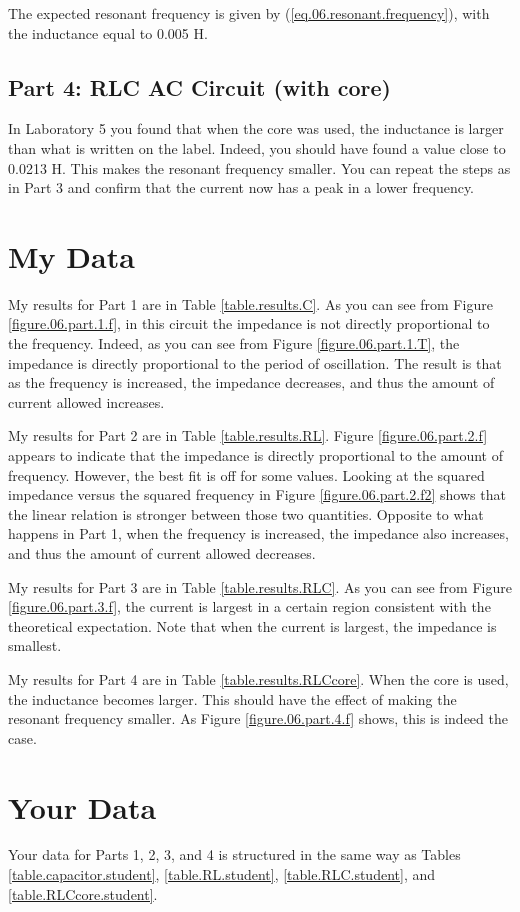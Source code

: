 The expected resonant frequency is given by (\ref{eq.06.resonant.frequency}), with the inductance equal to 0.005 H.
%
\subsection{Part 4: RLC AC Circuit (with core)}
%
In Laboratory 5 you found that when the core was used, the inductance is larger than what is written on the label. Indeed, you should have found a value close to 0.0213 H. This makes the resonant frequency smaller. You can repeat the steps as in Part 3 and confirm that the current now has a peak in a lower frequency.
%
\section{My Data}
%
My results for Part 1 are in Table \ref{table.results.C}. As you can see from Figure \ref{figure.06.part.1.f}, in this circuit the impedance is not directly proportional to the frequency. Indeed, as you can see from Figure \ref{figure.06.part.1.T}, the impedance is directly proportional to the period of oscillation. The result is that as the frequency is increased, the impedance decreases, and thus the amount of current allowed increases.

My results for Part 2 are in Table \ref{table.results.RL}. Figure \ref{figure.06.part.2.f} appears to indicate that the impedance is directly proportional to the amount of frequency. However, the best fit is off for some values. Looking at the squared impedance versus the squared frequency in Figure \ref{figure.06.part.2.f2} shows that the linear relation is stronger between those two quantities. Opposite to what happens in Part 1, when the frequency is increased, the impedance also increases, and thus the amount of current allowed decreases.

My results for Part 3 are in Table \ref{table.results.RLC}. As you can see from Figure \ref{figure.06.part.3.f}, the current is largest in a certain region consistent with the theoretical expectation. Note that when the current is largest, the impedance is smallest.

My results for Part 4 are in Table \ref{table.results.RLCcore}. When the core is used, the inductance becomes larger. This should have the effect of making the resonant frequency smaller. As Figure \ref{figure.06.part.4.f} shows, this is indeed the case.
%
\section{Your Data}
%
Your data for Parts 1, 2, 3, and 4 is structured in the same way as Tables \ref{table.capacitor.student}, \ref{table.RL.student}, \ref{table.RLC.student}, and \ref{table.RLCcore.student}.
%
\pagebreak
